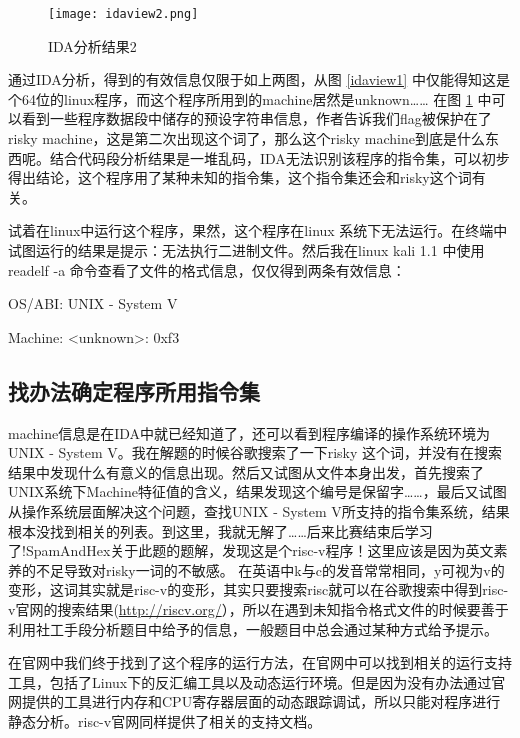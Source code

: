 \documentclass[a4paper,UTF8]{ctexart}
\begin{document}
\begin{figure}[hbt!]
  \centering
  \texttt{[image: idaview2.png]}
  \caption{IDA分析结果2}\label{idaview2}
\end{figure}

通过IDA分析，得到的有效信息仅限于如上两图，从图 \ref{idaview1} 中仅能得知这是个64位的linux程序，而这个程序所用到的machine居然是unknown…… 在图 \ref{idaview2} 中可以看到一些程序数据段中储存的预设字符串信息，作者告诉我们flag被保护在了risky machine，这是第二次出现这个词了，那么这个risky machine到底是什么东西呢。结合代码段分析结果是一堆乱码，IDA无法识别该程序的指令集，可以初步得出结论，这个程序用了某种未知的指令集，这个指令集还会和risky这个词有关。

试着在linux中运行这个程序，果然，这个程序在linux 系统下无法运行。在终端中试图运行的结果是提示：无法执行二进制文件。然后我在linux kali 1.1 中使用 readelf -a 命令查看了文件的格式信息，仅仅得到两条有效信息：

\begin{quizdesc}
  OS/ABI:                            UNIX - System V

  Machine:                           <unknown>: 0xf3
\end{quizdesc}

\subsection{找办法确定程序所用指令集}

machine信息是在IDA中就已经知道了，还可以看到程序编译的操作系统环境为UNIX - System V。我在解题的时候谷歌搜索了一下risky 这个词，并没有在搜索结果中发现什么有意义的信息出现。然后又试图从文件本身出发，首先搜索了UNIX系统下Machine特征值的含义，结果发现这个编号是保留字……，最后又试图从操作系统层面解决这个问题，查找UNIX - System V所支持的指令集系统，结果根本没找到相关的列表。到这里，我就无解了……后来比赛结束后学习了!SpamAndHex关于此题的题解，发现这是个risc-v程序！这里应该是因为英文素养的不足导致对risky一词的不敏感。
在英语中k与c的发音常常相同，y可视为v的变形，这词其实就是risc-v的变形，其实只要搜索risc就可以在谷歌搜索中得到risc-v官网的搜索结果(\url{http://riscv.org/}），所以在遇到未知指令格式文件的时候要善于利用社工手段分析题目中给予的信息，一般题目中总会通过某种方式给予提示。

在官网中我们终于找到了这个程序的运行方法，在官网中可以找到相关的运行支持工具\cite{risc_tools}，包括了Linux下的反汇编工具以及动态运行环境。但是因为没有办法通过官网提供的工具进行内存和CPU寄存器层面的动态跟踪调试，所以只能对程序进行静态分析。risc-v官网同样提供了相关的支持文档\cite{risc_doc}。
\end{document}
